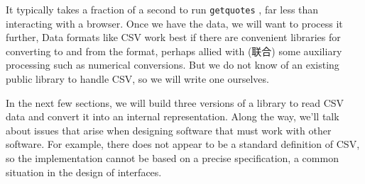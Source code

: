 It typically takes a fraction of a second to run \verb'getquotes' , far
less than interacting with a browser. Once we have the data, we will want
to process it further, Data formats like CSV work best if there are
convenient libraries for converting to and from the format, perhaps allied
with (联合) some auxiliary processing such as numerical conversions. But we
do not know of an existing public library to handle CSV, so we will write
one ourselves.

In the next few sections, we will build three versions of a library to read
CSV data and convert it into an internal representation. Along the way,
we'll talk about issues that arise when designing software that must work
with other software. For example, there does not appear to be a standard
definition of CSV, so the implementation cannot be based on a precise
specification, a common situation in the design of interfaces.
